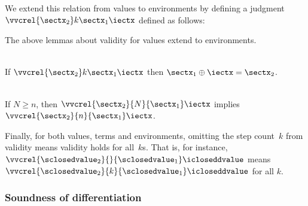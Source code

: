 \noindent
We extend this relation from values to environments by defining a
judgment $\vvcrel {\sectx_2} k {\sectx_1} \iectx$ defined as follows:
\begin{mathpar}

\end{mathpar}

The above lemmas about validity for values extend to environments.
\begin{lemma}
  \label{lemma:crel-oplus-env}
  \-\\
  If
  $\vvcrel {\sectx_2} k {\sectx_1} \iectx$ then
  $\sectx_1 \oplus \iectx = \sectx_2$.
\end{lemma}
\begin{lemma}
  \label{lemma:vvcrel-antimono-env}
  \-\\
  If $N \ge n$, then $\vvcrel{\sectx_2} {N} {\sectx_1} \iectx$ implies
  $\vvcrel{\sectx_2} {n} {\sectx_1} \iectx$.
\end{lemma}

Finally, for both values, terms and environments, omitting the step
count~$k$ from validity means validity holds for all~$k$s. That is,
for instance,
$\vvcrel {\sclosedvalue_2} {} {\sclosedvalue_1} \icloseddvalue$ means
$\vvcrel {\sclosedvalue_2} {k} {\sclosedvalue_1} \icloseddvalue$ for
all $k$.

\subsubsection{Soundness of differentiation}


